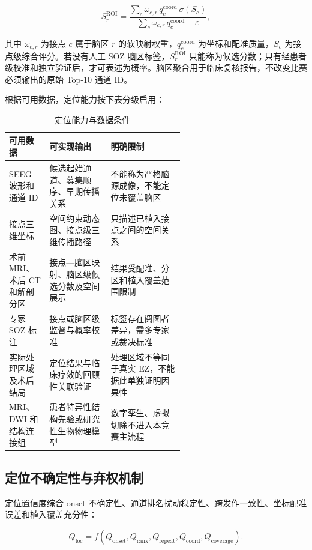 $$
S_r^{\mathrm{ROI}}=
\frac{\sum_c\omega_{c,r}\,q_c^{\mathrm{coord}}\,\sigma(S_c)}
{\sum_c\omega_{c,r}\,q_c^{\mathrm{coord}}+\varepsilon},
$$

其中 $\omega_{c,r}$ 为接点 $c$ 属于脑区 $r$ 的软映射权重，$q_c^{\mathrm{coord}}$ 为坐标和配准质量，$S_c$ 为接点级综合评分。若没有人工 SOZ 脑区标签，$S_r^{\mathrm{ROI}}$ 只能称为候选分数；只有经患者级校准和独立验证后，才可表述为概率。脑区聚合用于临床复核报告，不改变比赛必须输出的原始 Top-10 通道 ID。

根据可用数据，定位能力按下表分级启用：

\begin{table}[htbp]
    \centering
    \small
    \caption{定位能力与数据条件}
    \label{tab:space-levels}
    \renewcommand{\arraystretch}{1.25}
    \setlength{\tabcolsep}{3pt}
    \begin{tabularx}{\linewidth}{@{}p{0.23\linewidth}p{0.35\linewidth}X@{}}
        \toprule
        \textbf{可用数据} & \textbf{可实现输出} & \textbf{明确限制} \\
        \midrule
        SEEG 波形和通道 ID & 候选起始通道、募集顺序、早期传播关系 & 不能称为严格脑源成像，不能定位未覆盖脑区 \\
        接点三维坐标 & 空间约束动态图、接点级三维传播路径 & 只描述已植入接点之间的空间关系 \\
        术前 MRI、术后 CT 和解剖分区 & 接点—脑区映射、脑区级候选分数及空间展示 & 结果受配准、分区和植入覆盖范围限制 \\
        专家 SOZ 标注 & 接点或脑区级监督与概率校准 & 标签存在阅图者差异，需多专家或裁决标准 \\
        实际处理区域及术后结局 & 定位结果与临床疗效的回顾性关联验证 & 处理区域不等同于真实 EZ，不能据此单独证明因果性 \\
        MRI、DWI 和结构连接组 & 患者特异性结构先验或研究性生物物理模型 & 数字孪生、虚拟切除不进入本竞赛主流程 \\
        \bottomrule
    \end{tabularx}
\end{table}

\subsection{定位不确定性与弃权机制}

定位置信度综合 onset 不确定性、通道排名扰动稳定性、跨发作一致性、坐标配准误差和植入覆盖充分性：

$$
Q_{\mathrm{loc}}=
f(Q_{\mathrm{onset}},Q_{\mathrm{rank}},Q_{\mathrm{repeat}},
Q_{\mathrm{coord}},Q_{\mathrm{coverage}}).
$$

